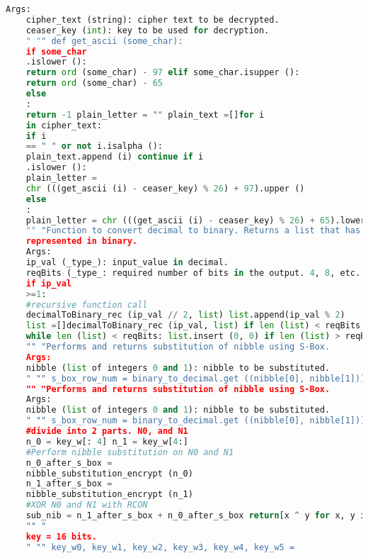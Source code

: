 \documentclass{article}
\begin{document}
\begin{lstlisting}[language=python, caption={Input Code}]
	Args:
	cipher_text (string): cipher text to be decrypted. 
	ceaser_key (int): key to be used for decryption.
	" "" def get_ascii (some_char):
	if some_char
	.islower ():
	return ord (some_char) - 97 elif some_char.isupper ():
	return ord (some_char) - 65
	else
	:
	return -1 plain_letter = "" plain_text =[]for i
	in cipher_text:
	if i
	== " " or not i.isalpha ():
	plain_text.append (i) continue if i
	.islower ():
	plain_letter =
	chr (((get_ascii (i) - ceaser_key) % 26) + 97).upper ()
	else
	:
	plain_letter = chr (((get_ascii (i) - ceaser_key) % 26) + 65).lower ()plain_text.append (plain_letter) return "".join (plain_text) def decimal_to_binary (ip_val, reqBits):
	"" "Function to convert decimal to binary. Returns a list that has integers 0 and 1
	represented in binary.
	Args:
	ip_val (_type_): input_value in decimal.
	reqBits (_type_: required number of bits in the output. 4, 8, etc. " "" def decimalToBinary_rec (ip_val, list):
	if ip_val
	>=1:
	#recursive function call
	decimalToBinary_rec (ip_val	// 2, list) list.append(ip_val % 2)
	list =[]decimalToBinary_rec (ip_val, list) if len (list) < reqBits:
	while len (list) < reqBits: list.insert (0, 0) if len (list) > reqBits: list.pop (0) return list def nibble_substitution_encrypt (nibble):
	"" "Performs and returns substitution of nibble using S-Box.
	Args:
	nibble (list of integers 0 and 1): nibble to be substituted.
	" "" s_box_row_num = binary_to_decimal.get ((nibble[0], nibble[1])) s_box_col_num = binary_to_decimal.get ((nibble[2], nibble[3])) nibble_after_s_box = s_box[s_box_row_num][s_box_col_num] nibble_after_s_box = decimal_to_binary (nibble_after_s_box, 4) return nibble_after_s_box def nibble_substitution_decrypt (nibble):
	"" "Performs and returns substitution of nibble using S-Box.
	Args:
	nibble (list of integers 0 and 1): nibble to be substituted.
	" "" s_box_row_num = binary_to_decimal.get ((nibble[0], nibble[1])) s_box_col_num = binary_to_decimal.get ((nibble[2], nibble[3])) nibble_after_s_box = inv_s_box[s_box_row_num][s_box_col_num] nibble_after_s_box = decimal_to_binary (nibble_after_s_box, 4) return nibble_after_s_box def key_expansion_function_g (key_w, round_number):
	#divide into 2 parts. N0, and N1
	n_0 = key_w[: 4] n_1 = key_w[4:]
	#Perform nibble substitution on N0 and N1
	n_0_after_s_box =
	nibble_substitution_encrypt (n_0)
	n_1_after_s_box =
	nibble_substitution_encrypt (n_1)
	#XOR N0 and N1 with RCON
	sub_nib = n_1_after_s_box + n_0_after_s_box return[x ^ y for x, y in zip (sub_nib, R_CON[round_number])] def make_keys (key):
	"" "
	key = 16 bits.
	" "" key_w0, key_w1, key_w2, key_w3, key_w4, key_w5 =

\end{lstlisting}
\end{document}
